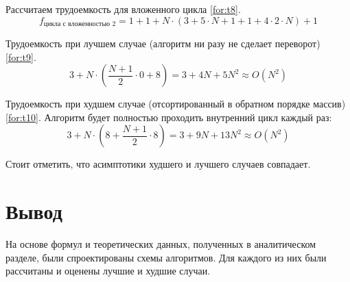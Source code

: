 Рассчитаем трудоемкость для вложенного цикла \ref{for:t8}.
\begin{equation}
\label{for:t8}
    f_{\text{цикла с вложенностью 2}} = 1 + 1 + N \cdot (3 + 5 \cdot N + 1 + 1 + 4 \cdot 2 \cdot N) + 1
\end{equation}

Трудоемкость при лучшем случае (алгоритм ни разу не сделает переворот) \ref{for:t9}.
\begin{equation}
\label{for:t9}
    3 + N \cdot (\frac{N + 1}{2} \cdot 0 + 8) = 3 + 4N + 5N^2 \approx O(N^2)
\end{equation}

Трудоемкость при худшем случае (отсортированный в обратном порядке массив) \ref{for:t10}.
Алгоритм будет полностью проходить внутренний цикл каждый раз:
\begin{equation}
\label{for:t10}
    3 + N \cdot (8 + \frac{N + 1}{2} \cdot 8) = 3 + 9N + 13N^2 \approx O(N^2)
\end{equation}

Стоит отметить, что асимптотики худшего и лучшего случаев совпадает.

\section*{Вывод}

На основе формул и теоретических данных, полученных в аналитическом разделе, были спроектированы схемы алгоритмов.
Для каждого из них были рассчитаны и оценены лучшие и худшие случаи.
